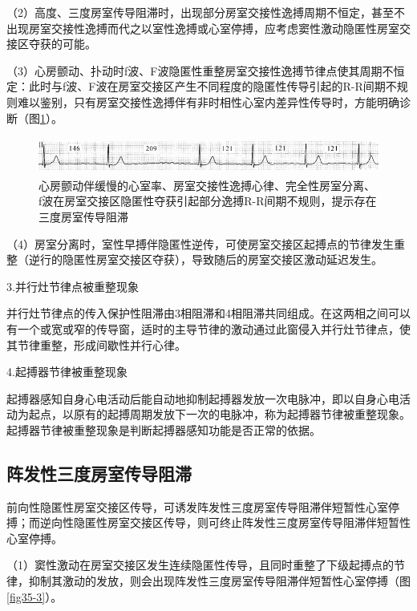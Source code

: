 （2）高度、三度房室传导阻滞时，出现部分房室交接性逸搏周期不恒定，甚至不出现房室交接性逸搏而代之以室性逸搏或心室停搏，应考虑窦性激动隐匿性房室交接区夺获的可能。

（3）心房颤动、扑动时f波、F波隐匿性重整房室交接性逸搏节律点使其周期不恒定：此时与f波、F波在房室交接区产生不同程度的隐匿性传导引起的R-R间期不规则难以鉴别，只有房室交接性逸搏伴有非时相性心室内差异性传导时，方能明确诊断（图\ref{fig35-2}）。

\begin{figure}[!htbp]
 \centering
 \includegraphics[width=5.58333in,height=0.47917in]{./images/Image00555.jpg}
 \captionsetup{justification=centering}
 \caption{心房颤动伴缓慢的心室率、房室交接性逸搏心律、完全性房室分离、f波在房室交接区隐匿性夺获引起部分逸搏R-R间期不规则，提示存在三度房室传导阻滞}
 \label{fig35-2}
  \end{figure} 

（4）房室分离时，室性早搏伴隐匿性逆传，可使房室交接区起搏点的节律发生重整（逆行的隐匿性房室交接区夺获），导致随后的房室交接区激动延迟发生。

3.并行灶节律点被重整现象

并行灶节律点的传入保护性阻滞由3相阻滞和4相阻滞共同组成。在这两相之间可以有一个或宽或窄的传导窗，适时的主导节律的激动通过此窗侵入并行灶节律点，使其节律重整，形成间歇性并行心律。

4.起搏器节律被重整现象

起搏器感知自身心电活动后能自动地抑制起搏器发放一次电脉冲，即以自身心电活动为起点，以原有的起搏周期发放下一次的电脉冲，称为起搏器节律被重整现象。起搏器节律被重整现象是判断起搏器感知功能是否正常的依据。

\protect\hypertarget{text00042.htmlux5cux23subid455}{}{}

\subsection{阵发性三度房室传导阻滞}

前向性隐匿性房室交接区传导，可诱发阵发性三度房室传导阻滞伴短暂性心室停搏；而逆向性隐匿性房室交接区传导，则可终止阵发性三度房室传导阻滞伴短暂性心室停搏。

（1）窦性激动在房室交接区发生连续隐匿性传导，且同时重整了下级起搏点的节律，抑制其激动的发放，则会出现阵发性三度房室传导阻滞伴短暂性心室停搏（图\ref{fig35-3}）。

